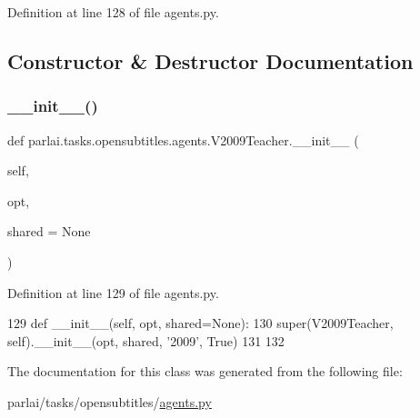 Definition at line 128 of file agents.\+py.



\subsection{Constructor \& Destructor Documentation}
\mbox{\label{classparlai_1_1tasks_1_1opensubtitles_1_1agents_1_1V2009Teacher_ad42d78a9d6ecfb02d6807452e3648fbe}} 
\subsubsection{\texorpdfstring{\+\_\+\+\_\+init\+\_\+\+\_\+()}{\_\_init\_\_()}}
{\footnotesize\ttfamily def parlai.\+tasks.\+opensubtitles.\+agents.\+V2009\+Teacher.\+\_\+\+\_\+init\+\_\+\+\_\+ (\begin{DoxyParamCaption}\item[{}]{self,  }\item[{}]{opt,  }\item[{}]{shared = {\ttfamily None} }\end{DoxyParamCaption})}



Definition at line 129 of file agents.\+py.


\begin{DoxyCode}
129     \textcolor{keyword}{def }\_\_init\_\_(self, opt, shared=None):
130         super(V2009Teacher, self).\_\_init\_\_(opt, shared, \textcolor{stringliteral}{'2009'}, \textcolor{keyword}{True})
131 
132 
\end{DoxyCode}


The documentation for this class was generated from the following file\+:\begin{DoxyCompactItemize}
\item 
parlai/tasks/opensubtitles/\hyperlink{parlai_2tasks_2opensubtitles_2agents_8py}{agents.\+py}\end{DoxyCompactItemize}
